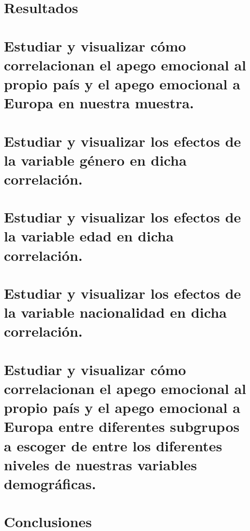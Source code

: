 \documentclass{article}
\begin{document}
\section*{Resultados}

\section{Estudiar y visualizar cómo correlacionan el apego emocional al propio país y el apego emocional a Europa en nuestra muestra.}

\section{Estudiar y visualizar los efectos de la variable género en dicha correlación.}

\section{Estudiar y visualizar los efectos de la variable edad en dicha correlación.}

\section{Estudiar y visualizar los efectos de la variable nacionalidad en dicha correlación.}

\section{Estudiar y visualizar cómo correlacionan el apego emocional al propio país y el apego emocional a Europa entre diferentes subgrupos a escoger de entre los diferentes niveles de nuestras variables demográficas.}

\section*{Conclusiones}
\end{document}
